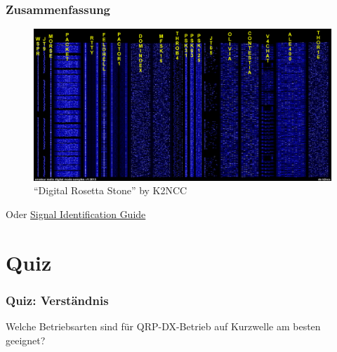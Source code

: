 \begin{frame}
  \frametitle{Zusammenfassung}

  \begin{center}
    \begin{figure}
      \includegraphics[width=\textwidth,height=.7\textheight,keepaspectratio]{e16/Digital_Rosetta_Stone.jpg}
      \caption{``Digital Rosetta Stone'' by K2NCC}
    \end{figure}
    Oder \href{http://www.sigidwiki.com/wiki/Signal_Identification_Guide}{\ExternalLink Signal Identification Guide}
  \end{center}

\end{frame}

\section[]{Quiz}

\begin{frame}
  \frametitle{Quiz: Verständnis}

  \begin{exampleblock}{Welche Betriebsarten sind für QRP-DX-Betrieb auf Kurzwelle am
    besten geeignet?}
  \end{exampleblock}



\end{frame}

